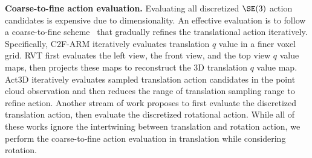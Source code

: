 \textbf{Coarse-to-fine action evaluation.}
Evaluating all discretized $\SE(3)$ action candidates is expensive due to dimensionality. An effective evaluation is to follow a coarse-to-fine scheme~\cite{Gualtieri2020hierarchical, james2022coarse, gervet2023act3d} that gradually refines the translational action iteratively. Specifically, C2F-ARM \cite{james2022coarse} iteratively evaluates translation $q$ value in a finer voxel grid. RVT \cite{rvt} first evaluates the left view, the front view, and the top view $q$ value maps, then projects these maps to reconstruct the 3D translation $q$ value map. Act3D \cite{gervet2023act3d} iteratively evaluates sampled translation action candidates in the point cloud observation and then reduces the range of translation sampling range to refine action. Another stream of work \cite{wang2021policy, wang2021equivariant, zhu2022grasp} proposes to first evaluate the discretized translation action, then evaluate the discretized rotational action. While all of these works ignore the intertwining between translation and rotation action, we perform the coarse-to-fine action evaluation in translation while considering rotation.